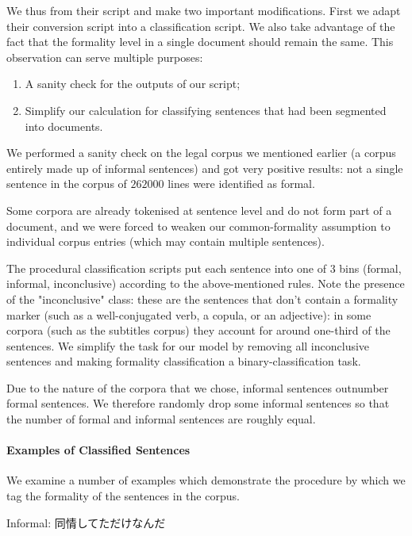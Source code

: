 \documentclass[11pt]{article}
\begin{document}
We thus from their script and make two important modifications. First we adapt their conversion script into a classification script. We also take advantage of the fact that the formality level in a single document should remain the same. This observation can serve multiple purposes:

\begin{enumerate}[label=\arabic*]
    \item A sanity check for the outputs of our script;
    \item Simplify our calculation for classifying sentences that had been segmented into documents.
\end{enumerate}

We performed a sanity check on the legal corpus we mentioned earlier (a corpus entirely made up of informal sentences) and got very positive results: not a single sentence in the corpus of $262000$ lines were identified as formal.

Some corpora are already tokenised at sentence level and do not form part of a document, and we were forced to weaken our common-formality assumption to individual corpus entries (which may contain multiple sentences). 

The procedural classification scripts put each sentence into one of $3$ bins (formal, informal, inconclusive) according to the above-mentioned rules. Note the presence of the "inconclusive" class: these are the sentences that don't contain a formality marker (such as a well-conjugated verb, a copula, or an adjective): in some corpora (such as the subtitles corpus) they account for around one-third of the sentences. We simplify the task for our model by removing all inconclusive sentences and making formality classification a binary-classification task. 

Due to the nature of the corpora that we chose, informal sentences outnumber formal sentences. We therefore randomly drop some informal sentences so that the number of formal and informal sentences are roughly equal.

\paragraph{Examples of Classified Sentences}

We examine a number of examples which demonstrate the procedure by which we tag the formality of the sentences in the corpus.

Informal: 同情してただけなんだ 
\end{document}

